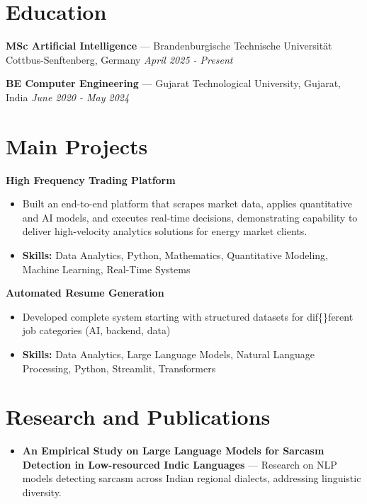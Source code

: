 \documentclass[a4paper,10pt]{article}
\begin{document}
\section*{Education}
\textbf{MSc Artificial Intelligence} — Brandenburgische Technische Universität Cottbus-Senftenberg, Germany \hfill \textit{April 2025 - Present}\par
\vspace{1.5pt}
\textbf{BE Computer Engineering} — Gujarat Technological University, Gujarat, India \hfill \textit{June 2020 - May 2024}\par

\section*{Main Projects}
\textbf{High Frequency Trading Platform}\par
\vspace{1pt}
\begin{itemize}
  \item Built an end-to-end platform that scrapes market data, applies quantitative and AI models, and executes real-time decisions, demonstrating capability to deliver high-velocity analytics solutions for energy market clients.
  \item \textbf{Skills:} Data Analytics, Python, Mathematics, Quantitative Modeling, Machine Learning, Real-Time Systems
\end{itemize}
\vspace{3pt}
\textbf{Automated Resume Generation}\par
\vspace{1pt}
\begin{itemize}
  \item Developed complete system starting with structured datasets for dif\{\}ferent job categories (AI, backend, data)
  \item \textbf{Skills:} Data Analytics, Large Language Models, Natural Language Processing, Python, Streamlit, Transformers
\end{itemize}

\section*{Research and Publications}
\begin{itemize}
\item \textbf{An Empirical Study on Large Language Models for Sarcasm Detection in Low-resourced Indic Languages} — Research on NLP models detecting sarcasm across Indian regional dialects, addressing linguistic diversity.
\end{itemize}
\end{document}
